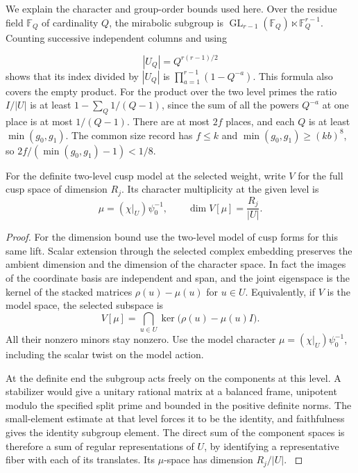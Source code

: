 We explain the character and group-order bounds used here.
Over the residue field \(\mathbb F_Q\) of cardinality \(Q\), the mirabolic subgroup is
\(\operatorname{GL}_{r-1}(\mathbb F_Q)\ltimes\mathbb F_Q^{r-1}\).
Counting successive independent columns and using

\[
  |U_Q|=Q^{r(r-1)/2}
\]
 shows that its index divided by
\(|U_Q|\) is \(\prod_{a=1}^{r-1}(1-Q^{-a})\). This formula
also covers the empty product. For the product over the
two level primes the ratio \(I/|U|\) is at least
\(1-\sum_Q 1/(Q-1)\), since the sum of all the powers
\(Q^{-a}\) at one place is at most \(1/(Q-1)\). There
are at most \(2f\) places, and each \(Q\) is at least
\(\min(g_0,g_1)\). The common size record has \(f\le k\) and
\(\min(g_0,g_1)\ge(kb)^8\), so
\(2f/(\min(g_0,g_1)-1)<1/8\).

\begin{lemma}
\label{lem:paired-character-share}
For the definite two-level cusp model at the selected weight, write \(V\) for the full cusp space of dimension \(R_j\). Its character multiplicity at the given level is
\[
 \mu=(\chi|_U)\psi_0^{-1},\qquad \dim V[\mu]=\frac{R_j}{|U|}.
\]

\end{lemma}

\begin{proof}
For the dimension bound use the two-level model of cusp
forms for this same lift. Scalar extension through the
selected complex embedding preserves the ambient dimension
and the dimension of the character space. In fact the
images of the coordinate basis are independent and span,
and the joint eigenspace is the kernel of the stacked
matrices \(\rho(u)-\mu(u)\) for \(u\in U\).
Equivalently, if \(V\) is the model space, the selected subspace is
\[
  V[\mu]=\bigcap_{u\in U}\ker\big(\rho(u)-\mu(u)I\big).
\]
 All their
nonzero minors stay nonzero. Use the model character
\(\mu=(\chi|_U)\psi_0^{-1}\), including the scalar
twist on the model action.

At the definite end the
subgroup acts freely on the components at this level.
A stabilizer would give a unitary rational matrix at a
balanced frame, unipotent modulo the specified split prime
and bounded in the positive definite norms. The
small-element estimate at that level forces it to be the
identity, and faithfulness gives the identity subgroup
element. The direct sum of the component spaces is therefore
a sum of regular representations of \(U\), by identifying
a representative fiber with each of its translates. Its
\(\mu\)-space has dimension \(R_j/|U|\).
\label{cor:paired-character-share-1}

\end{proof}

